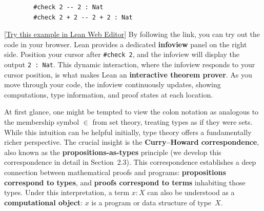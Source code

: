 \begin{example}\mbox{}
  \begin{lstlisting}
        #check 2 -- 2 : Nat
        #check 2 + 2 -- 2 + 2 : Nat
    \end{lstlisting}
  [\href{https://live.lean-lang.org/#codez=MQYwFgpiDWAEBMAoUkYNgagUA}{Try this example in Lean Web Editor}]
  By following the link, you can try out the code in your browser.
  Lean provides a dedicated \textbf{infoview} panel on the right side.
  Position your cursor after \lstinline[language=lean]|#check 2|,
  and the infoview will display the output
  \lstinline[language=lean]|2 : Nat|.
  This dynamic interaction, where the infoview responds to your
  cursor position, is what makes Lean an \textbf{interactive theorem
    prover}.
  As you move through your code, the infoview continuously updates,
  showing computations, type information, and proof states at each
  location.
\end{example}

At first glance, one might be tempted to view the colon notation as
analogous to the membership symbol $\in$ from set theory, treating
types as if they were sets.
While this intuition can be helpful initially, type theory offers a
fundamentally richer perspective.
The crucial insight is the \textbf{Curry--Howard correspondence},
also known as the \textbf{propositions-as-types} principle (we
develop this correspondence in detail in Section~2.3).
This correspondence establishes a deep connection between
mathematical proofs and programs:
\textbf{propositions correspond to types}, and \textbf{proofs
  correspond to terms} inhabiting those types.
Under this interpretation, a term $x : X$ can also be understood as a
\textbf{computational object}: $x$ is a program or data structure of
type~$X$.

